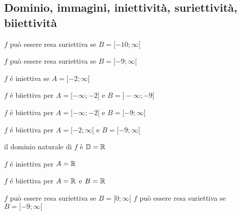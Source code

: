\subsection{Dominio, immagini, iniettività, suriettività, biiettività}

\begin{questions}


    \begin{qblock}
        \question

        \begin{checkboxes}

            \choice $f$ può essere resa suriettiva se $B=[-10;\infty[$

            \CorrectChoice $f$ può essere resa suriettiva se $B=[-9;\infty[$

            \CorrectChoice $f$ é iniettiva se $A=[-2;\infty[$

            \choice $f$ é biiettiva per $A=[-\infty;-2[$ e $B=]-\infty;-9[$

            \CorrectChoice $f$ é biiettiva per $A=[-\infty;-2[$ e $B=[-9;\infty[$

            \CorrectChoice $f$ é biiettiva per $A=[-2;\infty[$ e $B=[-9;\infty[$

            \CorrectChoice il dominio naturale di $f$ è $\mathbb{D}=\mathbb{R}$

            \choice $f$ é iniettiva per $A=\mathbb{R}$

            \choice $f$ é biiettiva per $A=\mathbb{R}$ e $B=\mathbb{R}$

        \end{checkboxes}
    \end{qblock}


    \begin{qblock}
        \question

        \begin{checkboxes}

            \CorrectChoice $f$  può essere resa suriettiva se  $B=[0;\infty[$
            \CorrectChoice $f$  può essere resa suriettiva se  $B=[-9;\infty[$


\end{checkboxes}
\end{qblock}
\end{questions}
